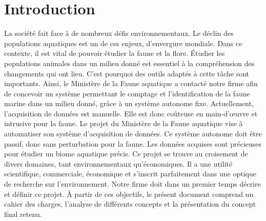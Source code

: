 
%
%


\chapter{Introduction}
\label{s:intro}

La société fait face à de nombreux défis environnementaux. Le déclin des populations aquatiques est un de ces enjeux, d’envergure mondiale.
Dans ce contexte, il est vital de pouvoir étudier la faune et la flore.
Étudier les populations animales dans un milieu donné est essentiel à la compréhension des changements qui ont lieu.
C’est pourquoi des outils adaptés à cette tâche sont importants.
\wl
Ainsi, le Ministère de la Faune aquatique a contacté notre firme afin de concevoir un système permettant le comptage et l’identification de la faune marine dans un milieu donné, grâce à un système autonome fixe.
Actuellement, l’acquisition de données est manuelle.
Elle est donc coûteuse en main-d’œuvre et intrusive pour la faune.
Le projet du Ministère de la Faune aquatique vise à automatiser son système d’acquisition de données.
Ce système autonome doit être passif, donc sans perturbation pour la faune.
Les données acquises sont précieuses pour étudier un biome aquatique précis.
\wl
Ce projet se trouve au croisement de divers domaines, tant environnementaux qu’économiques.
Il a une utilité scientifique, commerciale, économique et s’inscrit parfaitement dans une optique de recherche sur l’environnement.
\wl
Notre firme doit dans un premier temps décrire et définir ce projet.
À partir de ces objectifs, le présent document comprend un cahier des charges, l’analyse de différents concepts et la présentation du concept final retenu.